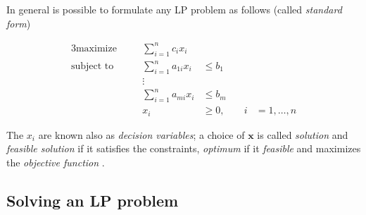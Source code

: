 %
In general is possible to formulate any \acrshort{LP} problem as follows (called \emph{standard form}) \cite{Vanderbei2008}

\begin{alignat}{3}
	\label{eq:standard-form}
	\text{maximize}   &       & \sum_{i=1}^{n} c_{i}x_{i}                                          \\
	\text{subject to} & \quad & \sum_{i=1}^{n} a_{1i}  x_{i} & \leq b_{1} &                        \\
	                  &       & \vdots                                                             \\
	                  &       & \sum_{i=1}^{n} a_{mi}  x_{i} & \leq b_{m} &                        \\
	                  &       & x_{i}                        & \geq 0,    & \quad i & =1 ,\dots, n
\end{alignat}


The $x_i$ are known also as \emph{decision variables}; a choice of $ \mathbf{x}
$ is called \emph{solution} and \emph{feasible solution} if it satisfies the
constraints, \emph{optimum} if it \emph{feasible} and maximizes the \emph{objective function}
\cite{Vanderbei2008}.

\subsection{Solving an LP problem}%
\label{sub:solving_an_lp_problem}

